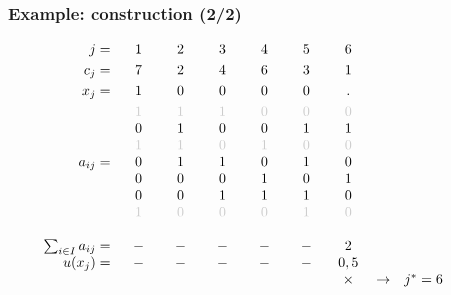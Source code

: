 \documentclass[]{beamer}
\newcommand{\grisc}[1]{\color{black!20}#1}
\begin{document}
\begin{frame}
  \frametitle{Example: construction (2/2)}
\vspace{3mm}

{\small

$
\begin{array}{r cccccccl}
%
j =   & 1 & 2 & 3 & 4 & 5 & 6 \vspace{1mm}\\
c_j =   & 7 & 2 & 4 &  6 & 3 & 1 \vspace{1mm}\\	
x_j =   & 1 & 0 & 0 & 0 & 0 & . \vspace{1mm}\\	
  & {\grisc 1} & {\grisc 1} & {\grisc 1} &  {\grisc 0} & {\grisc 0} & {\grisc 0}  \\
  & {0} & { 1} & { 0} &  { 0} & { 1} & { 1}  \\  
  & {\grisc 1} & {\grisc 1} & {\grisc 0} &  {\grisc 1} & {\grisc 0} & {\grisc 0}  \\ 
a_{ij} =  & { 0} & { 1} & { 1} &  { 0} & { 1} & { 0}  \\ 
  & 0 & 0 & 0 &  1 & 0 & 1  \\ 
  & 0 & 0 & 1 &  1 & 1 & 0  \\       
  &  {\grisc 1}  & {\grisc 0} & {\grisc 0} &   {\grisc 0}  & {\grisc 1} & {\grisc 0}  \\
  \\
\qquad \sum_{i\in I} a_{ij} = &	- &	- &	- &	- &	- &	2 \\	
u(x_j) = &	- & - &  - & - &  - & 0,5 \\	
               &  &  &  &  &  &  \times &  \rightarrow & j^{*} =   6 \vspace{1mm} \\  
\quad & \qquad & \qquad & \qquad & \qquad & \qquad & \qquad & \\
\\ %
\end{array}
$ 
}
 

\end{frame}

%
%
\end{document}
